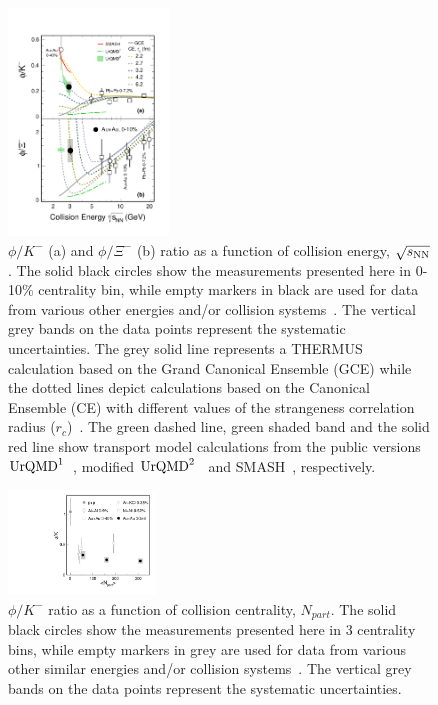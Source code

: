 \documentclass[aps,tightenlines,superscriptaddress,twocolumn]{revtex4-1}
\begin{document}
\begin{figure}
\centering
\hspace*{-4mm}
\includegraphics[width=0.38\textwidth]{fig4_phi_over_kminus_zoomin-eps-converted-to.pdf}
  \caption{$\phi/K^-$ (a) and $\phi/\Xi^-$ (b) ratio as a function of collision energy, $\sqrt{s_{\rm NN}}$. The solid black circles show the measurements presented here in 0-10\% centrality bin, while empty markers in black are used for data from various other energies and/or collision systems~\cite{E917_phi:2004,NA49_phi:2008,HADES_phi_ArKCl:2009,Xi_ArKCl_HADES:2009,FOPI_phi_NiNi:2015,FOPI_phi_AlAl:2016,HADES_phi_AuAu:2018,star_bes_strangeness:2020}. The vertical grey bands on the data points represent the systematic uncertainties. The grey solid line represents a THERMUS calculation based on the Grand Canonical Ensemble (GCE) while the dotted lines depict calculations based on the Canonical Ensemble (CE) with different values of the strangeness correlation radius ($r_c$)~\cite{THERMUS_WHEATON200984,Andronic_2018Naure}. The green dashed line, green shaded band and the solid red line show transport model calculations from the public versions $\textup{UrQMD}^{1}$~\cite{UrQMD_2:1998,urQMD:1999}, modified $\textup{UrQMD}^{2}$~\cite{Steinheimer_2015_UrQMD} and SMASH~\cite{Elfner_SMASH:2019}, respectively.}
\label{fig:phi2Kratio} 
\end{figure}


\begin{figure}
\centering
\hspace*{-4mm}
\includegraphics[width=0.35\textwidth]{ratio_vs_Npart.pdf}
  \caption{$\phi/K^-$ ratio as a function of collision centrality, $N_{part}$. The solid black circles show the measurements presented here in 3 centrality bins, while empty markers in grey are used for data from various other similar energies and/or collision systems~\cite{ANKE_phi:2008,HADES_phi_ArKCl:2009,FOPI_phi_NiNi:2015,FOPI_phi_AlAl:2016,HADES_phi_AuAu:2018}. The vertical grey bands on the data points represent the systematic uncertainties.}
\label{fig:phi2KratioCent} 
\end{figure}
\end{document}
